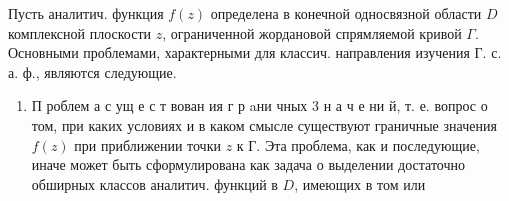 \documentclass[10pt]{article}
\begin{document}
Пусть аналитич. функция $f(z)$ определена в конечной односвязной области $D$ комплексной плоскости $z$, ограниченной жордановой спрямляемой кривой $\Gamma$. Основными проблемами, характерными для классич. направления изучения Г. с. а. ф., являются следующие.



\begin{enumerate}

  \item П роблем а с ущ е с т вован ия г р aни чных 3 н а ч е ни й, т. е. вопрос о том, при каких условиях и в каком смысле существуют граничные значения $f(z)$ при приближении точки $z$ к Г. Эта проблема, как и последующие, иначе может быть сформулирована как задача о выделении достаточно обширных классов аналитич. функций в $D$, имеющих в том или

\end{enumerate}
\end{document}
